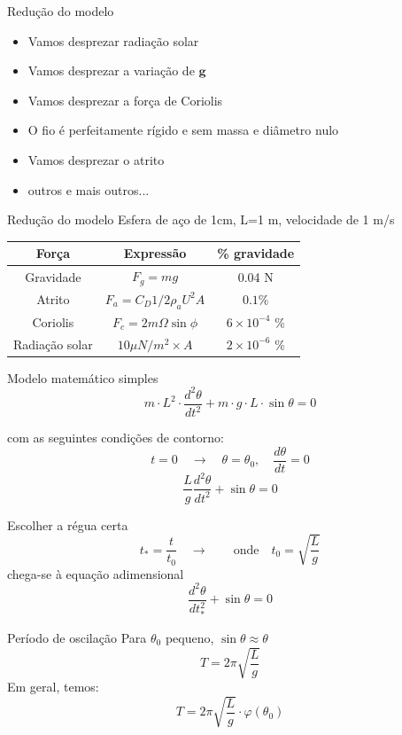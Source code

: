 \documentclass{beamer}
\newcommand{\pr}[1]{\ensuremath{ \mathbf{#1}}}    %
\newcommand{\lra}{\ensuremath{\longrightarrow}}
\newcommand{\p}[1]{\ensuremath{ \mathbf{#1}}}    %
\newcommand{\qrq}{\ensuremath{\quad\lra\quad}}
\begin{document}
\begin{frame}{Redução do modelo}
  \begin{itemize}
  \item Vamos desprezar radiação solar
  \item Vamos desprezar a variação de $\p{g}$
  \item Vamos desprezar a força de Coriolis
  \item O fio é perfeitamente rígido e sem massa e diâmetro nulo
  \item Vamos desprezar o atrito
  \item outros e mais outros...
  \end{itemize}
\end{frame}


\begin{frame}{Redução do modelo}
  Esfera de aço de 1cm, L=1 m, velocidade de 1 m/s

  
  \centering
  \begin{tabular}{c|c|c}
    \hline
    Força & Expressão & \% gravidade \\
    \hline
   Gravidade & $F_g = mg$ &   0.04 N\\
   Atrito &  $F_a = C_D 1/2 \rho_a  U^2 A$ &  $0.1$\% \\
   Coriolis & $F_c = 2m\Omega\sin\phi$  & $6\times 10^{-4}$ \% \\
   Radiação solar &  $10\mu N/m^2 \times A$ & $2\times 10^{-6}$ \%\\
   \hline
  \end{tabular}
\end{frame}
  
\begin{frame}{Modelo matemático simples}
\[
m\cdot L^2\cdot\frac{d^2\theta}{dt^2} + m\cdot g\cdot L\cdot \sin\theta = 0
\]

com as seguintes condições de contorno:
\[
t = 0 \qrq \theta=\theta_0, \quad\frac{d\theta}{dt} = 0
\]
\[
\frac{L}{g}\frac{d^2\theta}{dt^2} + \sin\theta = 0 
\]

\end{frame}


\begin{frame}{Escolher a régua certa}
  \[
  t_* = \frac{t}{t_0}\qrq \quad\text{onde}\quad t_0 = \sqrt{\frac{L}{g}}
\]
chega-se à equação adimensional
\[
\frac{d^2\theta}{dt_*^2} + \sin\theta = 0 
\]

\end{frame}

\begin{frame}{Período de oscilação}
  Para $\theta_0$ pequeno, $\sin\theta \approx \theta$
  \[
  T = 2\pi\sqrt{\frac{L}{g}}
  \]
  Em geral, temos:
\[
T = 2\pi\sqrt{\frac{L}{g}}\cdot\varphi(\theta_0)   
\]
\end{frame}
\end{document}
